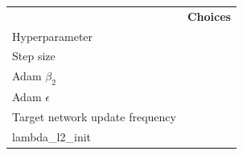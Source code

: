 \begin{tabular}{ll}
 & \bfseries Choices \\
Hyperparameter &  \\
Step size &  \\
Adam $\beta_2$ &  \\
Adam $\epsilon$ &  \\
Target network update frequency &  \\
lambda_l2_init &  \\
\end{tabular}
